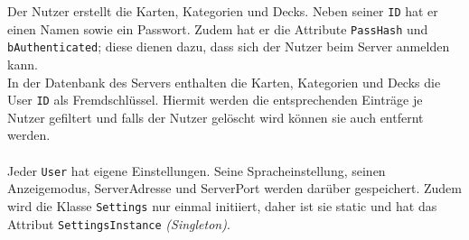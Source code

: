 \documentclass[fontsize=12pt,paper=a4,twoside]{scrartcl}
\begin{document}
Der Nutzer erstellt die Karten, Kategorien und Decks. Neben seiner \texttt{ID} hat er einen Namen sowie ein Passwort. Zudem hat er die Attribute \texttt{PassHash} und \texttt{bAuthenticated}; diese dienen dazu, dass sich der Nutzer beim Server anmelden kann. \\
In der Datenbank des Servers enthalten die Karten, Kategorien und Decks die User \texttt{ID} als Fremdschlüssel. Hiermit werden die entsprechenden Einträge je Nutzer gefiltert und falls der Nutzer gelöscht wird können sie auch entfernt werden.\\
\\

Jeder \texttt{User} hat eigene Einstellungen. Seine Spracheinstellung, seinen Anzeigemodus, ServerAdresse und ServerPort werden darüber gespeichert.
Zudem wird die Klasse \texttt{Settings} nur einmal initiiert, daher ist sie static und hat das Attribut \texttt{SettingsInstance} \textit{(Singleton)}.

\begin{landscape}
    \thispagestyle{empty}
    
\end{landscape}
\end{document}
